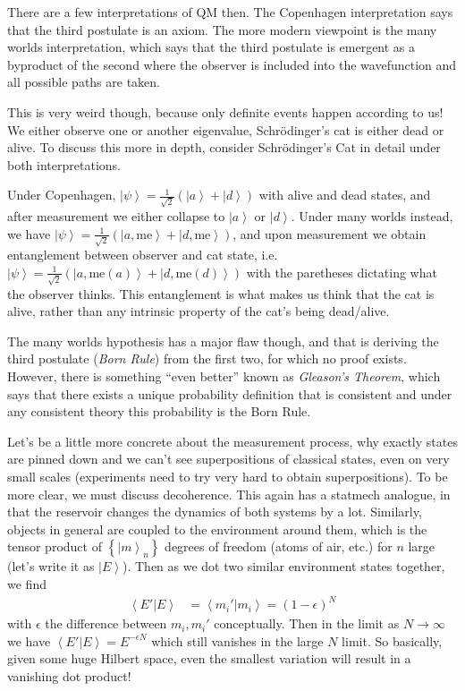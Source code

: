 \documentclass[10pt]{report}
\newcommand{\ket}[1]{\left|#1\right>}
\newcommand{\dotp}[2]{\left<#1\left.\right|#2\right>}
\begin{document}
There are a few interpretations of QM then. The Copenhagen interpretation says that the third postulate is an axiom. The more modern viewpoint is the many worlds interpretation, which says that the third postulate is emergent as a byproduct of the second where the observer is included into the wavefunction and all possible paths are taken. 

This is very weird though, because only definite events happen according to us! We either observe one or another eigenvalue, Schr\"odinger's cat is either dead or alive. To discuss this more in depth, consider Schr\"odinger's Cat in detail under both interpretations.

Under Copenhagen, $\ket{\psi} = \frac{1}{\sqrt{2}}\left( \ket{a} + \ket{d} \right)$ with alive and dead states, and after measurement we either collapse to $\ket{a}$ or $\ket{d}$. Under many worlds instead, we have $\ket{\psi} = \frac{1}{\sqrt{2}}(\ket{a, \text{me}} + \ket{d, \text{me}})$, and upon measurement we obtain entanglement between observer and cat state, i.e. $\ket{\psi} = \frac{1}{\sqrt{2}}\left( \ket{a, \text{me}(a)} + \ket{d, \text{me}(d)} \right)$ with the paretheses dictating what the observer thinks. This entanglement is what makes us think that the cat is alive, rather than any intrinsic property of the cat's being dead/alive.

The many worlds hypothesis has a major flaw though, and that is deriving the third postulate (\emph{Born Rule}) from the first two, for which no proof exists. However, there is something ``even better'' known as \emph{Gleason's Theorem}, which says that there exists a unique probability definition that is consistent and under any consistent theory this probability is the Born Rule.

Let's be a little more concrete about the measurement process, why exactly states are pinned down and we can't see superpositions of classical states, even on very small scales (experiments need to try very hard to obtain superpositions). To be more clear, we must discuss decoherence. This again has a statmech analogue, in that the reservoir changes the dynamics of both systems by a lot. Similarly, objects in general are coupled to the environment around them, which is the tensor product of $\left\{ \ket{m}_n \right\}$ degrees of freedom (atoms of air, etc.) for $n$ large (let's write it as $\ket{E}$). Then as we dot two similar environment states together, we find
\begin{align}
    \dotp{E'}{E} &= \dotp{m_i'}{m_i} = (1-\epsilon)^N
\end{align}
with $\epsilon$ the difference between $m_i, m_i'$ conceptually. Then in the limit as $N \to \infty$ we have $\dotp{E'}{E} = E^{-\epsilon N}$ which still vanishes in the large $N$ limit. So basically, given some huge Hilbert space, even the smallest variation will result in a vanishing dot product!
\end{document}
